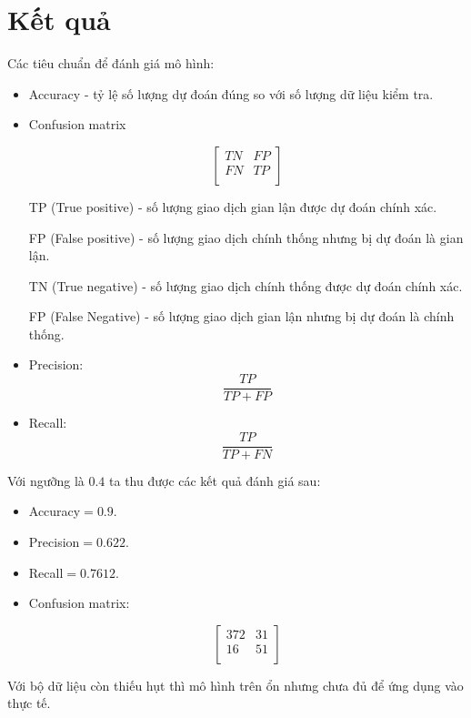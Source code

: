 \section{Kết quả}
Các tiêu chuẩn để đánh giá mô hình:
\begin{itemize}
	\item Accuracy - tỷ lệ số lượng dự đoán đúng so với số lượng dữ liệu kiểm tra.
	\item Confusion matrix 
	
	$$
	\begin{bmatrix} 
		TN & FP \\
		FN & TP \\
	\end{bmatrix}
	$$

	TP (True positive) - số lượng giao dịch gian lận được dự đoán chính xác.
	
	FP (False positive) - số lượng giao dịch chính thống nhưng bị dự đoán là gian lận.
	
	TN (True negative) - số lượng giao dịch chính thống được dự đoán chính xác.
	
	FP (False Negative) - số lượng giao dịch gian lận nhưng bị dự đoán là chính thống.
	\item Precision: $$\frac{TP}{TP+FP}$$
	\item Recall:
	$$\frac{TP}{TP+FN}$$
\end{itemize}

Với ngưỡng là $0.4$ ta thu được các kết quả đánh giá sau:
\begin{itemize}
	\item Accuracy$=0.9$.
	\item Precision$=0.622$.
	\item Recall$=0.7612$.
	\item Confusion matrix:
	
	$$
	\begin{bmatrix} 
	372 & 31 \\
	16 & 51 \\
	\end{bmatrix}
	$$
	
\end{itemize}

Với bộ dữ liệu còn thiếu hụt thì mô hình trên ổn nhưng chưa đủ để ứng dụng vào thực tế.

